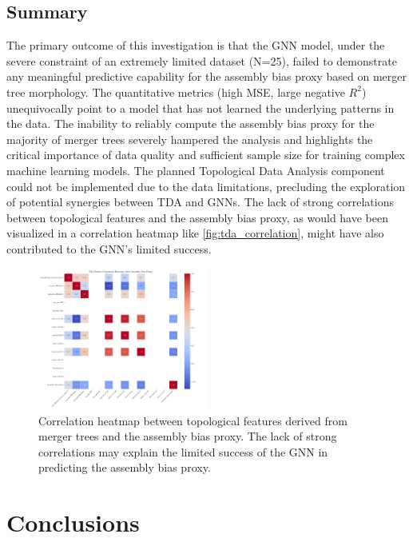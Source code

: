 \documentclass[twocolumn]{aastex631}
\begin{document}
\subsection{Summary}

The primary outcome of this investigation is that the GNN model, under the severe constraint of an extremely limited dataset (N=25), failed to demonstrate any meaningful predictive capability for the assembly bias proxy based on merger tree morphology. The quantitative metrics (high MSE, large negative $R^2$) unequivocally point to a model that has not learned the underlying patterns in the data. The inability to reliably compute the assembly bias proxy for the majority of merger trees severely hampered the analysis and highlights the critical importance of data quality and sufficient sample size for training complex machine learning models. The planned Topological Data Analysis component could not be implemented due to the data limitations, precluding the exploration of potential synergies between TDA and GNNs. The lack of strong correlations between topological features and the assembly bias proxy, as would have been visualized in a correlation heatmap like \autoref{fig:tda_correlation}, might have also contributed to the GNN's limited success.

\begin{figure}[htbp]
    \centering
    \includegraphics[width=0.5\textwidth]{../input_files/plots/tda_feature_correlation_heatmap_3_1748137556.png}
    \caption{\label{fig:tda_correlation}Correlation heatmap between topological features derived from merger trees and the assembly bias proxy. The lack of strong correlations may explain the limited success of the GNN in predicting the assembly bias proxy.}
\end{figure}

\section{Conclusions}
\label{sec:conclusions}
\end{document}
